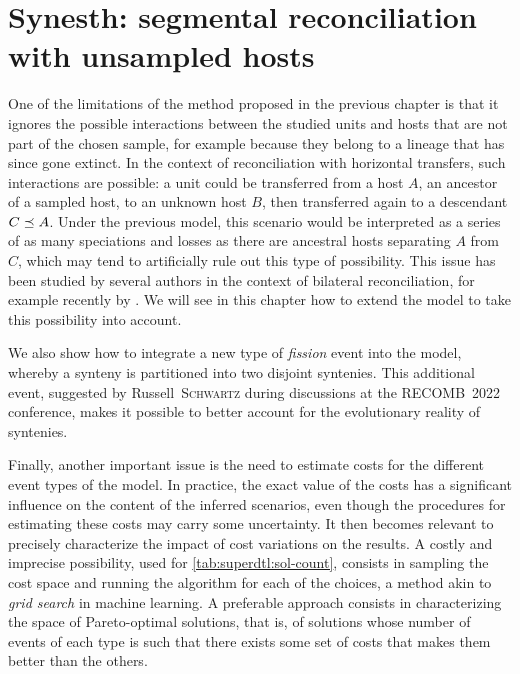 \chapter{Synesth: segmental reconciliation with unsampled hosts}\label{chap:synesth}

One of the limitations of the method proposed in the previous chapter is that it ignores the possible interactions between the studied units and hosts that are not part of the chosen sample, for example because they belong to a lineage that has since gone extinct.
In the context of reconciliation with horizontal transfers, such interactions are possible: a unit could be transferred from a host \(A\), an ancestor of a sampled host, to an unknown host \(B\), then transferred again to a descendant \(C \preceq A\).
Under the previous model, this scenario would be interpreted as a series of as many speciations and losses as there are ancestral hosts separating \(A\) from \(C\), which may tend to artificially rule out this type of possibility.
This issue has been studied by several authors in the context of bilateral reconciliation, for example recently by \textcite{Weiner2021ImprovedDuplicationTransfer}.
We will see in this chapter how to extend the model to take this possibility into account.

We also show how to integrate a new type of \emph{fission} event into the model, whereby a synteny is partitioned into two disjoint syntenies.
This additional event, suggested by Russell~\textsc{Schwartz} during discussions at the RECOMB~2022 conference, makes it possible to better account for the evolutionary reality of syntenies.

Finally, another important issue is the need to estimate costs for the different event types of the model.
In practice, the exact value of the costs has a significant influence on the content of the inferred scenarios, even though the procedures for estimating these costs may carry some uncertainty.
It then becomes relevant to precisely characterize the impact of cost variations on the results.
A costly and imprecise possibility, used for \cref{tab:superdtl:sol-count}, consists in sampling the cost space and running the algorithm for each of the choices, a method akin to \emph{grid search} in machine learning.
A preferable approach consists in characterizing the space of Pareto-optimal solutions, that is, of solutions whose number of events of each type is such that there exists some set of costs that makes them better than the others.


